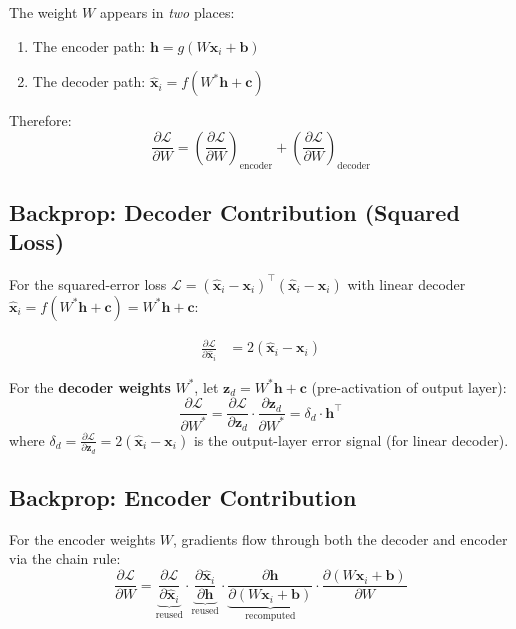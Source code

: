 \documentclass[12pt,a4paper]{article}
\newcommand{\vx}{\mathbf{x}}
\newcommand{\vh}{\mathbf{h}}
\newcommand{\vb}{\mathbf{b}}
\newcommand{\vc}{\mathbf{c}}
\newcommand{\vz}{\mathbf{z}}
\newcommand{\hatx}{\hat{\mathbf{x}}}
\newcommand{\Loss}{\mathcal{L}}
\begin{document}
The weight $W$ appears in \emph{two} places:
\begin{enumerate}
  \item The encoder path: $\vh = g(W\vx_i + \vb)$
  \item The decoder path: $\hatx_i = f(W^*\vh + \vc)$
\end{enumerate}

Therefore:
\[
  \frac{\partial\Loss}{\partial W}
  = \left(\frac{\partial\Loss}{\partial W}\right)_{\text{encoder}}
  + \left(\frac{\partial\Loss}{\partial W}\right)_{\text{decoder}}
\]

\subsection{Backprop: Decoder Contribution (Squared Loss)}

For the squared-error loss $\Loss = (\hatx_i - \vx_i)^\top(\hatx_i - \vx_i)$ with linear decoder $\hatx_i = f(W^*\vh + \vc) = W^*\vh + \vc$:

\begin{align*}
  \frac{\partial\Loss}{\partial\hatx_i}
  &= 2(\hatx_i - \vx_i)
\end{align*}

For the \textbf{decoder weights} $W^*$, let $\vz_d = W^*\vh + \vc$ (pre-activation of output layer):
\[
  \frac{\partial\Loss}{\partial W^*}
  = \frac{\partial\Loss}{\partial \vz_d} \cdot \frac{\partial \vz_d}{\partial W^*}
  = \delta_d \cdot \vh^\top
\]
where $\delta_d = \frac{\partial\Loss}{\partial \vz_d} = 2(\hatx_i - \vx_i)$ is the output-layer error signal (for linear decoder).

\subsection{Backprop: Encoder Contribution}

For the encoder weights $W$, gradients flow through both the decoder and encoder via the chain rule:
\[
  \frac{\partial\Loss}{\partial W}
  = \underbrace{\frac{\partial\Loss}{\partial\hatx_i}}_{\text{reused}}
    \cdot \underbrace{\frac{\partial\hatx_i}{\partial\vh}}_{\text{reused}}
    \cdot \underbrace{\frac{\partial\vh}{\partial(W\vx_i+\vb)}}_{\text{recomputed}}
    \cdot \frac{\partial(W\vx_i+\vb)}{\partial W}
\]
\end{document}
